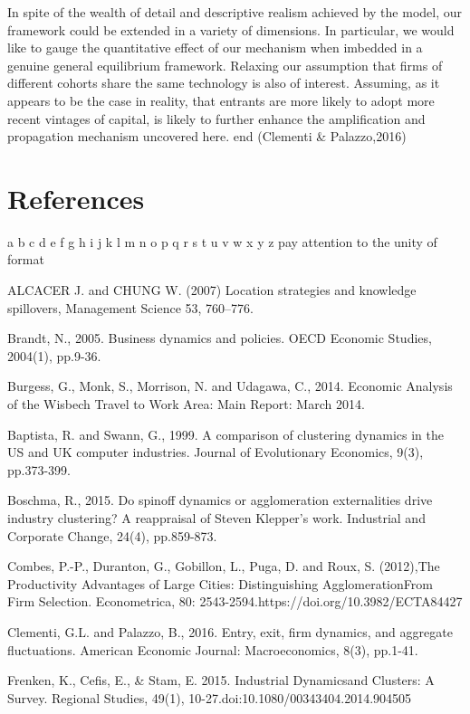 \documentclass[
  12pt,
  oneside]{book}
\begin{document}
In spite of the wealth of detail and descriptive realism achieved by the model, our framework could be extended in a variety of dimensions. In particular, we would like to gauge the quantitative effect of our mechanism when imbedded in a genuine general equilibrium framework. Relaxing our assumption that firms of different cohorts share the same technology is also of interest. Assuming, as it appears to be the case in reality, that entrants are more likely to adopt more recent vintages of capital, is likely to further enhance the amplification and propagation mechanism uncovered here.
end (Clementi \& Palazzo,2016)

\hypertarget{references}{%
\chapter*{References}\label{references}}

a b c d e f g h i j k l m n o p q r s t u v w x y z
pay attention to the unity of format

ALCACER J. and CHUNG W. (2007) Location strategies and knowledge spillovers, Management Science 53, 760--776.

Brandt, N., 2005. Business dynamics and policies. OECD Economic Studies, 2004(1), pp.9-36.

Burgess, G., Monk, S., Morrison, N. and Udagawa, C., 2014. Economic Analysis of the Wisbech Travel to Work Area: Main Report: March 2014.

Baptista, R. and Swann, G., 1999. A comparison of clustering dynamics in the US and UK computer industries. Journal of Evolutionary Economics, 9(3), pp.373-399.

Boschma, R., 2015. Do spinoff dynamics or agglomeration externalities drive industry clustering? A reappraisal of Steven Klepper's work. Industrial and Corporate Change, 24(4), pp.859-873.

Combes, P.-P., Duranton, G., Gobillon, L., Puga, D. and Roux, S. (2012),The Productivity Advantages of Large Cities: Distinguishing AgglomerationFrom Firm Selection. Econometrica, 80: 2543-2594.https://doi.org/10.3982/ECTA84427

Clementi, G.L. and Palazzo, B., 2016. Entry, exit, firm dynamics, and aggregate fluctuations. American Economic Journal: Macroeconomics, 8(3), pp.1-41.

Frenken, K., Cefis, E., \& Stam, E. 2015. Industrial Dynamicsand Clusters: A Survey. Regional Studies, 49(1), 10-27.doi:10.1080/00343404.2014.904505
\end{document}

